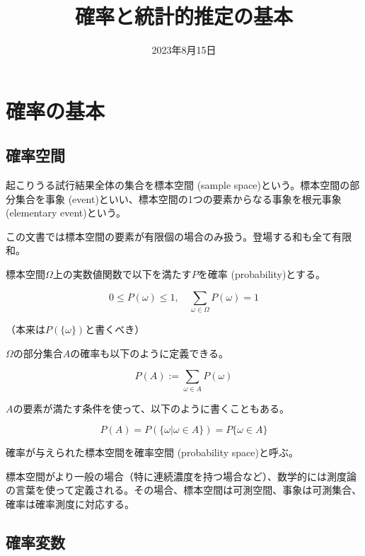 \documentclass[uplatex,dvipdfmx]{jlreq}
\newcommand\term[1]{\textsf{#1}}
\begin{document}
\title{確率と統計的推定の基本}
\date{2023年8月15日}
\maketitle

\section{確率の基本}

\subsection{確率空間}

起こりうる試行結果全体の集合を\term{標本空間 (sample space)}という。標本空間の部分集合を\term{事象 (event)}といい、標本空間の1つの要素からなる事象を\term{根元事象 (elementary event)}という。

この文書では標本空間の要素が有限個の場合のみ扱う。登場する和も全て有限和。

標本空間$\Omega$上の実数値関数で以下を満たす$P$を\term{確率 (probability)}とする。

\begin{equation}
    0 \leq P(\omega) \leq 1,
    \quad \sum_{\omega\in\Omega} P(\omega) = 1
\end{equation}

（本来は$P(\{\omega\})$と書くべき）

$\Omega$の部分集合$A$の確率も以下のように定義できる。

\begin{equation}
    P(A) := \sum_{\omega\in A}P(\omega)
\end{equation}

$A$の要素が満たす条件を使って、以下のように書くこともある。

\begin{equation}
    P(A) = P(\{\omega|\omega\in A\}) = P\{\omega\in A\}
\end{equation}

確率が与えられた標本空間を\term{確率空間 (probability space)}と呼ぶ。

\begin{note}
    標本空間がより一般の場合（特に連続濃度を持つ場合など）、数学的には測度論の言葉を使って定義される。その場合、標本空間は可測空間、事象は可測集合、確率は確率測度に対応する。
\end{note}

\subsection{確率変数}
\end{document}
